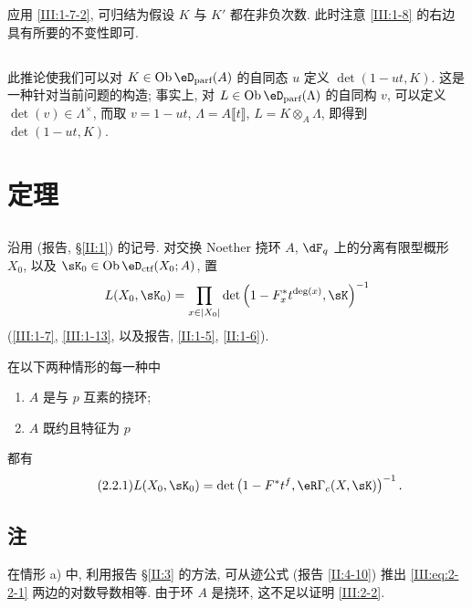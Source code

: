 应用 \ref{III:1-7-2}, 可归结为假设 $K$ 与 $K'$ 都在非负次数. 此时注意 \ref{III:1-8} 的右边具有所要的不变性即可.

\subsection{}\label{III:1-14}

此推论使我们可以对 $K\in \ob\eD_\text{parf}(A)$ 的自同态 $u$ 定义 $\det(1-u t,K)$. 这是一种针对当前问题的构造; 事实上, 对 $L\in\ob\eD_\text{parf}(\Lambda)$ 的自同构 $v$, 可以定义 $\det(v)\in\Lambda^\times$, 而取 $v=1-u t$, $\Lambda=A\llbracket t\rrbracket$, $L=K\otimes_A\Lambda$, 即得到 $\det(1-u t,K)$.

\section{定理}\label{III:2}

\subsection{}\label{III:2-1}

沿用 (报告, \S\ref{II:1}) 的记号. 对交换 Noether 挠环 $A$, $\dF_q$ 上的分离有限型概形 $X_0$, 以及 $\sK_0\in\ob\eD_\text{ctf}(X_0;A)$, 置
\[
  L(X_0,\sK_0) = \prod_{x\in |X_0|} \det\left(1-F_x^* t^{\deg(x)}, \sK\right)^{-1}
\]
(\ref{III:1-7}, \ref{III:1-13}, 以及报告, \ref{II:1-5}, \ref{II:1-6}).

\begin{theorem_}\label{III:2-2}
在以下两种情形的每一种中
\begin{enumerate}[\indent a)]
  \item $A$ 是与 $p$ 互素的挠环;
  \item $A$ 既约且特征为 $p$
\end{enumerate}
都有
\begin{equation*}\tag{2.2.1}\label{III:eq:2-2-1}
  L(X_0,\sK_0) = \det\left(1-F^* t^f, \eR\Gamma_c(X,\sK)\right)^{-1} \text{.}
\end{equation*}
\end{theorem_}

\subsection{注}\label{III:2-3}

在情形 a) 中, 利用报告 \S\ref{II:3} 的方法, 可从迹公式 (报告 \ref{II:4-10}) 推出 \eqref{III:eq:2-2-1} 两边的对数导数相等. 由于环 $A$ 是挠环, 这不足以证明 \ref{III:2-2}.

